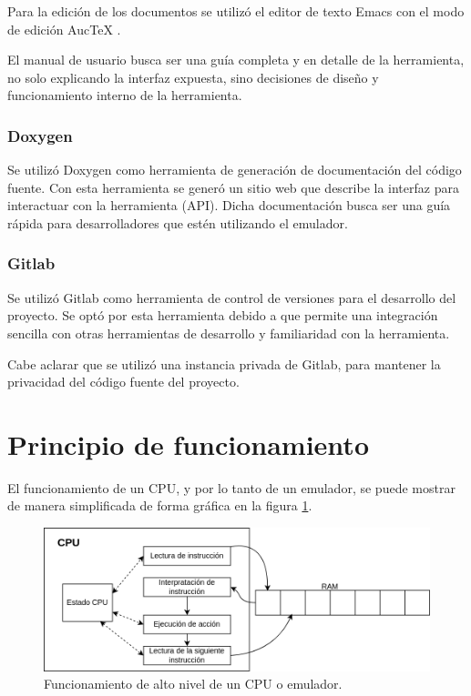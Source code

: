 Para la edición de los documentos se utilizó el editor de texto Emacs con el modo de edición AucTeX \citep{AUCTEX}.

El manual de usuario busca ser una guía completa y en detalle de la herramienta, no solo explicando la interfaz expuesta, sino decisiones de diseño y funcionamiento interno de la herramienta.

\subsubsection{Doxygen}
\label{subsec:doxygen}

Se utilizó Doxygen \citep{DOXYGEN} como herramienta de generación de documentación del código fuente. Con esta herramienta se generó un sitio web que describe la interfaz para interactuar con la herramienta (API). Dicha documentación busca ser una guía rápida para desarrolladores que estén utilizando el emulador.

\subsubsection{Gitlab}
\label{subsec:gitlab}

Se utilizó Gitlab \citep{GITLAB} como herramienta de control de versiones para el desarrollo del proyecto. Se optó por esta herramienta debido a que permite una integración sencilla con otras herramientas de desarrollo y familiaridad con la herramienta.

Cabe aclarar que se utilizó una instancia privada de Gitlab, para mantener la privacidad del código fuente del proyecto.


\section{Principio de funcionamiento}
\label{sec:principio_funcionamiento}

El funcionamiento de un CPU, y por lo tanto de un emulador, se puede mostrar de manera simplificada de forma gráfica en la figura \ref{fig:functionamiento_emulador}.

\begin{figure}[htbp]
	\centering
	\includegraphics[width=1\textwidth]{./Figures/funcionamiento_emulador}
	\caption{Funcionamiento de alto nivel de un CPU o emulador.}
	\label{fig:functionamiento_emulador}
\end{figure}

